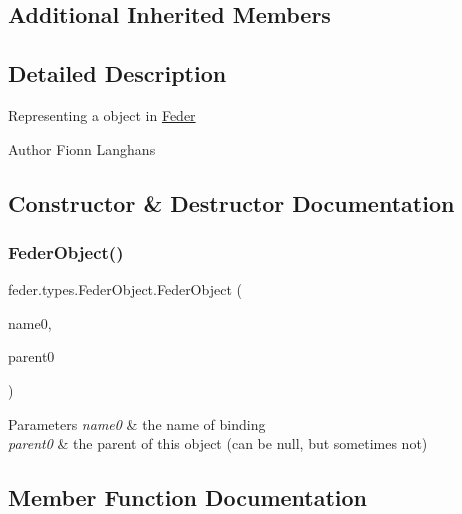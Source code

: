 \subsection*{Additional Inherited Members}


\subsection{Detailed Description}
Representing a object in \hyperlink{classfeder_1_1Feder}{Feder} \begin{DoxyAuthor}{Author}
Fionn Langhans 
\end{DoxyAuthor}


\subsection{Constructor \& Destructor Documentation}
\mbox{\label{classfeder_1_1types_1_1FederObject_aeb1732353aa6704a36fcf17ed22fb4a5}} 
\subsubsection{\texorpdfstring{Feder\+Object()}{FederObject()}}
{\footnotesize\ttfamily feder.\+types.\+Feder\+Object.\+Feder\+Object (\begin{DoxyParamCaption}\item[{String}]{name0,  }\item[{\hyperlink{classfeder_1_1types_1_1FederBody}{Feder\+Body}}]{parent0 }\end{DoxyParamCaption})}


\begin{DoxyParams}{Parameters}
{\em name0} & the name of binding \\
\hline
{\em parent0} & the parent of this object (can be null, but sometimes not) \\
\hline
\end{DoxyParams}


\subsection{Member Function Documentation}
\mbox{\label{classfeder_1_1types_1_1FederObject_a455578a3f7a79b56512c7a6eeebe676c}} 
